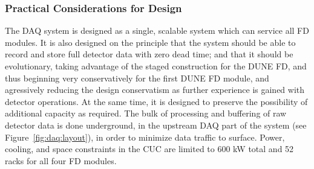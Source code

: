 %  


\subsubsection{Practical Considerations for Design}

The DAQ system is designed as a single, scalable system which can service all FD
modules.
It is also designed on the principle that the system should be able to record
and store full detector data with zero dead time; and that it should be
evolutionary, taking advantage of the staged construction for the DUNE FD, and
thus beginning very conservatively for the first DUNE FD module, and agressively
reducing the design conservatism as further experience is gained with detector
operations.
At the same time, it is designed to preserve the possibility of additional
capacity as required.
The bulk of processing and buffering of raw detector data is done underground,
in the upstream DAQ part of the system (see Figure~\ref{fig:daq:layout}), in
order to minimize data traffic to surface.
Power, cooling, and space constraints in the CUC are limited to 600 kW total and
52 racks for all four FD modules.

